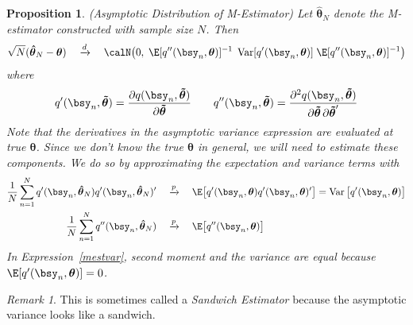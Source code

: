 \documentclass[12pt]{article}
\theoremstyle{plain}
\newtheorem{prop}[thm]{Proposition}
\theoremstyle{definition}
\theoremstyle{remark}
\newtheorem*{rmk}{Remark}
\newcommand{\bstheta}{\boldsymbol{\theta}}
\newcommand{\bshattheta}{\boldsymbol{\hat{\theta}}}
\newcommand{\bstildetheta}{\boldsymbol{\tilde{\theta}}}
\newcommand{\Var}{\operatorname{Var}}
\newcommand{\pto}{\xrightarrow{p}}
\newcommand{\dto}{\xrightarrow{d}}
\newcommand{\sumnN}{\sum^N_{n=1}}
\begin{document}
\begin{prop}\emph{(Asymptotic Distribution of M-Estimator)}
\label{prop:masymp}
Let $\bshattheta_N$ denote the M-estimator constructed with sample size
$N$. Then
\begin{align*}
  \sqrt{N}(\bshattheta_N-\bstheta)
  \quad\dto\quad
  \calN\big(0,\;
  \E[q''(\bsy_n,\bstheta)]^{-1}
  \;
  \Var[q'(\bsy_n,\bstheta)]
  \;
  \E[q''(\bsy_n,\bstheta)]^{-1}
  \big)
\end{align*}
where
\begin{align*}
  q'(\bsy_n,\bstildetheta)
  =
  \frac{\partial q(\bsy_n,\bstildetheta)}{%
    \partial\bstildetheta}
  \qquad
  q''(\bsy_n,\bstildetheta)
  =
  \frac{\partial^2 q(\bsy_n,\bstildetheta)}{%
    \partial\bstildetheta\,\partial\bstildetheta'}
\end{align*}
Note that the derivatives in the asymptotic variance expression are
evaluated at true $\bstheta$.  Since we don't know the true $\bstheta$
in general, we will need to estimate these components. We do so by
approximating the expectation and variance terms with
\begin{align}
  \frac{1}{N}\sumnN q'(\bsy_n,\bshattheta_N)q'(\bsy_n,\bshattheta_N)'
  \quad&\pto\quad
  \E\big[q'(\bsy_n,\bstheta)q'(\bsy_n,\bstheta)'\big]
  =
  \Var\big[q'(\bsy_n,\bstheta)\big]
  \label{mestvar}
  \\
  \frac{1}{N}\sumnN q''(\bsy_n,\bshattheta_N)
  \quad&\pto\quad
  \E\big[q''(\bsy_n,\bstheta)\big]
  \notag
\end{align}
In Expression~\ref{mestvar}, second moment and the variance are equal
because $\E[q'(\bsy_n,\bstheta)]=0$.
\end{prop}
\begin{rmk}
This is sometimes called a \emph{Sandwich Estimator} because the
asymptotic variance looks like a sandwich.
\end{rmk}
\end{document}
